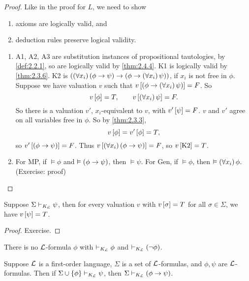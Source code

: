 \begin{proof}
Like in the proof for $ L $, we need to show
\begin{enumerate}
\item axioms are logically valid, and
\item deduction rules preserve logical validity.
\end{enumerate}
\begin{enumerate}
\item A1, A2, A3 are substitution instances of propositional tautologies, by \ref{def:2.2.1}, so are logically valid by \ref{thm:2.4.4}. K1 is logically valid by \ref{thm:2.3.6}. K2 is $ \impb{\fab{x_i}\impb{\phi}{\psi}}{\impb{\phi}{\fab{x_i}\psi}} $, if $ x_i $ is not free in $ \phi $. Suppose we have valuation $ v $ such that $ v\sb{\impb{\phi}{\fab{x_i}\psi}} = F $. So
$$ v\sb{\phi} = T, \qquad v\sb{\fab{x_i}\psi} = F. $$
So there is a valuation $ v' $, $ x_i $-equivalent to $ v $, with $ v'\sb{\psi} = F $. $ v $ and $ v' $ agree on all variables free in $ \phi $. So by \ref{thm:2.3.3},
$$ v\sb{\phi} = v'\sb{\phi} = T, $$
so $ v'\sb{\impb{\phi}{\psi}} = F $. Thus $ v\sb{\fab{x_i}\impb{\phi}{\psi}} = F $, so $ v\sb{\text{K2}} = T $.
\item For MP, if $ \vDash \phi $ and $ \vDash \impb{\phi}{\psi} $, then $ \vDash \psi $. For Gen, if $ \vDash \phi $, then $ \vDash \fab{x_i}\phi $. (Exercise: proof)
\end{enumerate}
\end{proof}

\pagebreak

\begin{example}
\label{eg:2.4.6}
Suppose $ \Sigma \vdash_{K_{\LL}} \psi $, then for every valuation $ v $ with $ v\sb{\sigma} = T $ for all $ \sigma \in \Sigma $, we have $ v\sb{\psi} = T $.
\end{example}

\begin{proof}
Exercise.
\end{proof}

\begin{corollary}
\label{cor:2.4.7}
There is no $ \LL $-formula $ \phi $ with $ \vdash_{K_{\LL}} \phi $ and $ \vdash_{K_{\LL}} \notb{\phi} $.
\end{corollary}

\begin{theorem}
Suppose $ \LL $ is a first-order language, $ \Sigma $ is a set of $ \LL $-formulas, and $ \phi, \psi $ are $ \LL $-formulas. Then if $ \Sigma \cup \cb{\phi} \vdash_{K_{\LL}} \psi $, then $ \Sigma \vdash_{K_{\LL}} \impb{\phi}{\psi} $.
\end{theorem}

